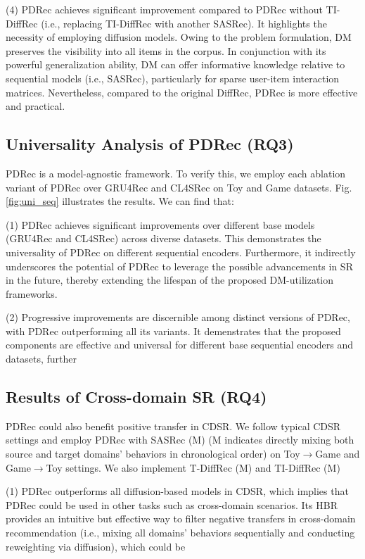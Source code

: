 \documentclass[letterpaper]{article} %
\begin{document}
(4) PDRec achieves significant improvement compared to PDRec without TI-DiffRec (i.e., replacing TI-DiffRec with another SASRec). It highlights the necessity of employing diffusion models. Owing to the problem formulation, DM preserves the visibility into all items in the corpus. In conjunction with its powerful generalization ability, DM can offer informative knowledge relative to sequential models (i.e., SASRec), particularly for sparse user-item interaction matrices. Nevertheless, compared to the original DiffRec, PDRec is more effective and practical.


\subsection{Universality Analysis of PDRec (RQ3)}
\label{sec.uni_seq}
PDRec is a model-agnostic framework. To verify this, we employ each ablation variant of PDRec over GRU4Rec \cite{GRU4Rec} and CL4SRec \cite{CL4SRec} on Toy and Game datasets. Fig. \ref{fig:uni_seq} illustrates the results. We can find that:

(1) PDRec achieves significant improvements over different base models (GRU4Rec and CL4SRec) across diverse datasets. This demonstrates the universality of PDRec on different sequential encoders. Furthermore, it indirectly underscores the potential of PDRec to leverage the possible advancements in SR in the future, thereby extending the lifespan of the proposed DM-utilization frameworks.

(2) Progressive improvements are discernible among distinct versions of PDRec, with PDRec outperforming all its variants. It demenstrates that the proposed components are effective and universal for different base sequential encoders and datasets, further



\subsection{Results of Cross-domain SR (RQ4)}
\label{sec.uni_scen}

PDRec could also benefit positive transfer in CDSR. We follow typical CDSR settings \cite{Tri-CDR, DDGHM} and employ PDRec with SASRec (M) (M indicates directly mixing both source and target domains' behaviors in chronological order) on Toy$\rightarrow$Game and Game$\rightarrow$Toy settings. We also implement T-DiffRec (M) and TI-DiffRec (M)

(1) PDRec outperforms all diffusion-based models in CDSR, which implies that PDRec could be used in other tasks such as cross-domain scenarios. Its HBR provides an intuitive but effective way to filter negative transfers in cross-domain recommendation (i.e., mixing all domains' behaviors sequentially and conducting reweighting via diffusion), which could be
\end{document}
